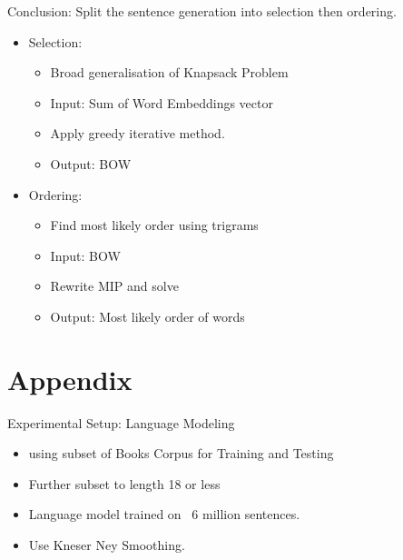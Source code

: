 \documentclass[]{beamer}
\newcommand{\x}{\tilde{x}}
\newcommand{\V}{\mathcal{V}}
\newcommand{\B}{\mathcal{B}}
\newcommand{\s}{w_{\blacktriangleright}}
\begin{document}


\begin{frame}{Conclusion: Split the sentence generation into selection then ordering.}
	\begin{itemize}
		\item<1->Selection:
		\begin{itemize}
			\item Broad generalisation of Knapsack Problem
			\item Input: Sum of Word Embeddings vector
			\item Apply greedy iterative method.
			\item Output: BOW
		\end{itemize}
		\vfill
		\item<2->Ordering: 
		\begin{itemize}
			\item Find most likely order using trigrams
			\item Input: BOW
			\item Rewrite MIP and solve
			\item Output: Most likely order of words
		\end{itemize}
	\end{itemize}
\end{frame}

\section{Appendix}

\begin{frame}{Experimental Setup: Language Modeling}
	\begin{itemize}
		\item using subset of Books Corpus for Training and Testing
		\item<1-> Further subset to length 18 or less
		\vfill
		\item<2-> Language model trained on ~6 million sentences.
		\item<2-> Use Kneser Ney Smoothing. 
		
	\end{itemize}
\end{frame}



\newcommand{\vectorselectionproblemdefnalt}{Find the bag of vectors $\B$ (a multi-subset of $\V$), such that $\displaystyle \Sigma(\B)=\sum_{\x_a\in\B}\x_a$ we have  $\min d(\s,\Sigma(\B))$}
\end{document}
